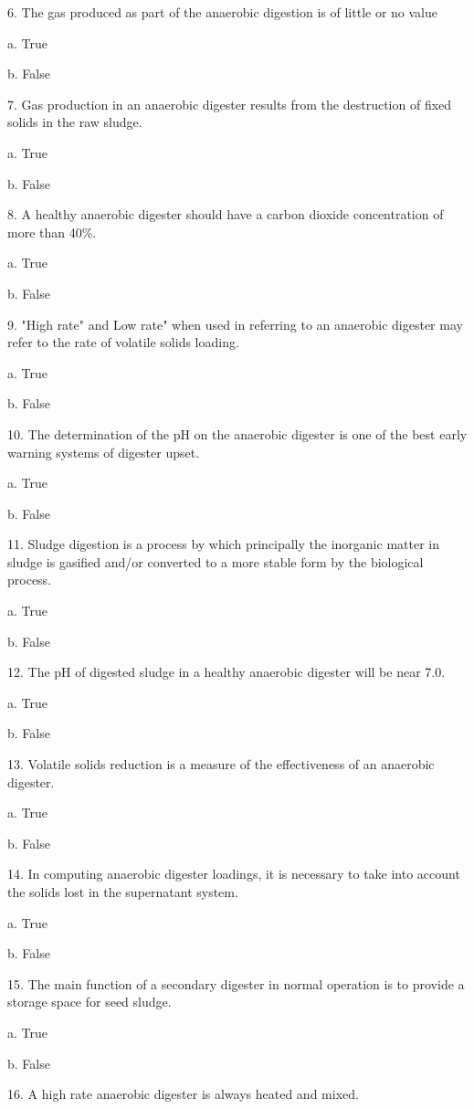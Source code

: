 \documentclass{article}
\begin{document}
6. The gas produced as part of the anaerobic digestion is of little or no value 

a. True 

b. False 


7. Gas production in an anaerobic digester results from the destruction of fixed solids in the raw sludge. 

a. True 

b. False 


8. A healthy anaerobic digester should have a carbon dioxide concentration of more than 40\%. 

a. True 

b. False 


9. "High rate" and Low rate" when used in referring to an anaerobic digester may refer to the rate of volatile solids loading. 

a. True 

b. False 


10. The determination of the pH on the anaerobic digester is one of the best early warning systems of digester upset. 

a. True 

b. False 


11. Sludge digestion is a process by which principally the inorganic matter in sludge is gasified and/or converted to a more stable form by the biological process. 

a. True 

b. False 


12. The pH of digested sludge in a healthy anaerobic digester will be near 7.0. 

a. True 

b. False 


13. Volatile solids reduction is a measure of the effectiveness of an anaerobic digester. 

a. True 

b. False 


14. In computing anaerobic digester loadings, it is necessary to take into account the solids lost in the supernatant system. 

a. True 

b. False 


15. The main function of a secondary digester in normal operation is to provide a storage space for seed sludge. 

a. True 

b. False 


16. A high rate anaerobic digester is always heated and mixed. 
\end{document}
